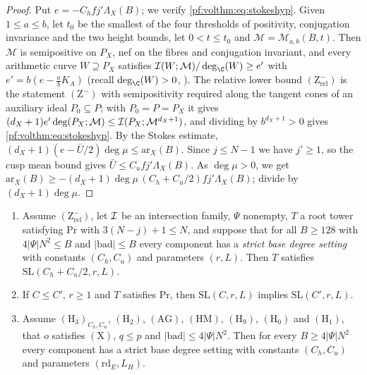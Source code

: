 \begin{proof}
Put $e=-C_hfj'\Lambda_X(B)$; we verify \eqref{pf:volthm:eq:stokeshyp}. Given $1\le a\le b$, let $t_0$ be the
smallest of the four thresholds of positivity, conjugation invariance and the two height bounds, let $0<t\le t_0$
and $\mathcal M=\mathcal M_{a,b}(B,t)$. Then $\mathcal M$ is semipositive on $P_X$, nef on the fibres and
conjugation invariant, and every arithmetic curve $W\supseteq P_X$ satisfies
$\volthmII(W;\mathcal M)/\deg_\C(W)\ge e'$ with $e'=b(e-\frac abK_A)$ (recall $\deg_\C(W)>0$,
). The relative lower bound
$(\mathrm{Z}^-_{\mathrm{rel}})$ is the statement $(\mathrm{Z}^-)$ with semipositivity required along the tangent
cones of an auxiliary ideal $P_0\subseteq P$; with $P_0=P=P_X$ it gives
$(d_X+1)e'\deg(P_X;\mathcal M)\le\mathcal{I}(P_X;\mathcal M^{d_X+1})$, and dividing by $b^{d_X+1}>0$ gives
\eqref{pf:volthm:eq:stokeshyp}. By the Stokes estimate, $(d_X+1)(e-\bar U/2)\deg\mu\le\mathrm{ar}_X(B)$. Since
$j\le N-1$ we have $j'\ge1$, so the cusp mean bound gives $\bar U\le C_ufj'\Lambda_X(B)$. As $\deg\mu>0$, we get
$\mathrm{ar}_X(B)\ge-(d_X+1)\deg\mu\,(C_h+C_u/2)fj'\Lambda_X(B)$; divide by $(d_X+1)\deg\mu$.
\end{proof}

\begin{proposition}\label{pf:volthm:prop:slope}
\begin{enumerate}[label=(\alph*)]
\item Assume $(\mathrm{Z}^-_{\mathrm{rel}})$, let $\mathcal{I}$ be an intersection family, $\Psi$ nonempty, $T$ a root tower satisfying
  $\mathrm{Pr}$ with $3(N-j)+1\le N$, and suppose that for all $B\ge128$ with $4|\Psi|N^2\le B$ and
  $|\mathrm{bad}|\le B$ every component has a \emph{strict base degree setting} with constants $(C_h,C_u)$ and
  parameters $(r,L)$. Then $T$ satisfies $\mathrm{SL}(C_h+C_u/2,r,L)$.
\item If $C\le C'$, $r\ge1$ and $T$ satisfies $\mathrm{Pr}$, then $\mathrm{SL}(C,r,L)$ implies
  $\mathrm{SL}(C',r,L)$.
\item Assume $(\mathrm{H}_3)_{C_h,C_u}$, $(\mathrm{H}_2)$, $(\mathrm{AG})$, $(\mathrm{HM})$,
  $(\mathrm{H}_9)$, $(\mathrm{H}_0)$ and $(\mathrm{H}_1)$, that $o$ satisfies $(\mathrm{X})$,
  $q\le p$ and $|\mathrm{bad}|\le4|\Psi|N^2$. Then for every $B\ge4|\Psi|N^2$ every component has a strict base degree
  setting with constants $(C_h,C_u)$ and parameters $(\mathrm{rd}_E,L_H)$.
\end{enumerate}
\end{proposition}

